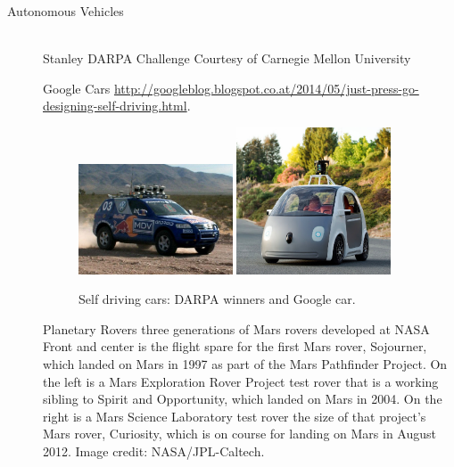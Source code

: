 \begin{description}
\item[Autonomous Vehicles]\hfill \\
Stanley \citep{stanley}
DARPA Challenge Courtesy of Carnegie Mellon University

Google Cars \url{http://googleblog.blogspot.co.at/2014/05/just-press-go-designing-self-driving.html}.

\begin{figure}[thpb]
	  \myfloatalign
      \footnotesize
      \centering
    \subfloat
    {  \label{fig:fig_stanley}
        \includegraphics[width=0.45\textwidth]{figures/fig_stanley.jpg}
    }    
    \subfloat
    {  \label{fig:fig_googlecar}
       \includegraphics[width=0.45\textwidth]{figures/fig_googlecar.jpg}
    }
   \caption[Selfdriving car]{Self driving cars: DARPA winners and Google car.}
   \label{fig:fig_auto}
\end{figure}

Planetary Rovers
three generations of Mars rovers developed at NASA
Front and center is the flight spare for the first Mars rover, Sojourner, which landed on Mars in 1997 as part of the Mars Pathfinder Project. On the left is a Mars Exploration Rover Project test rover that is a working sibling to Spirit and Opportunity, which landed on Mars in 2004. On the right is a Mars Science Laboratory test rover the size of that project's Mars rover, Curiosity, which is on course for landing on Mars in August 2012.
Image credit: NASA/JPL-Caltech.
\cite{PavoneAcikmese2014rover}


\end{description}
